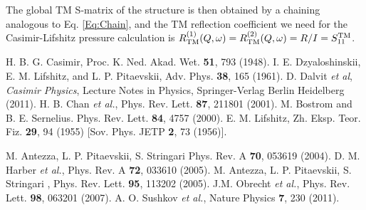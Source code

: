 \documentclass[aps,pra,superscriptaddress,amsmath,amssymb,showpacs,twocolumn,notitlepage]{revtex4-1}
\begin{document}
The global TM S-matrix of the structure is then obtained by a chaining analogous to  Eq. \eqref{Eq:Chain}, and the TM reflection coefficient we need for the Casimir-Lifshitz pressure calculation is $R_{\rm{TM}}^{(1)}(Q,\omega)=R_{\rm{TM}}^{(2)}(Q,\omega)=R/I=S_{11}^{\rm{TM}}$. \\

\begin{thebibliography}{100}
 H. B. G. Casimir, Proc. K. Ned. Akad. Wet. {\bf 51}, 793 (1948).
 I. E. Dzyaloshinskii, E. M. Lifshitz, and L. P. Pitaevskii, Adv. Phys. {\bf 38}, 165 (1961).
 D. Dalvit \emph{et al}, \emph{Casimir Physics}, Lecture Notes in Physics, Springer-Verlag Berlin Heidelberg (2011).
 H. B. Chan \emph{et al.}, Phys. Rev. Lett. {\bf 87}, 211801 (2001).
 M. Bostr\:om and B. E. Sernelius. Phys. Rev. Lett. {\bf 84}, 4757 (2000).
 E. M. Lifshitz, Zh. Eksp. Teor. Fiz. {\bf 29}, 94 (1955) [Sov. Phys. JETP {\bf 2}, 73 (1956)].


 M. Antezza, L. P. Pitaevskii, S. Stringari
Phys. Rev. A {\bf 70}, 053619 (2004).
  D. M. Harber \emph{et al.}, Phys. Rev. A {\bf 72}, 033610 (2005).
 M. Antezza, L. P. Pitaevskii, S. Stringari , Phys. Rev. Lett. {\bf 95}, 113202 (2005).
 J.M. Obrecht \emph{et al.}, Phys. Rev. Lett. {\bf 98}, 063201 (2007).
 A. O. Sushkov \emph{et al.}, Nature Physics {\bf 7}, 230 (2011).


\end{thebibliography}
\end{document}
